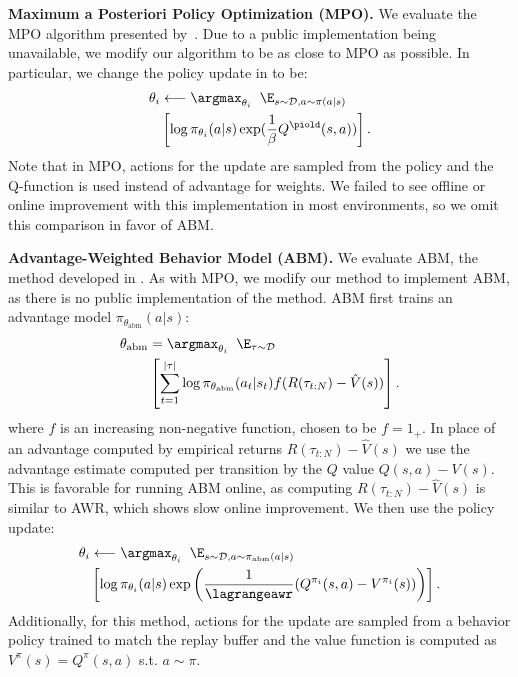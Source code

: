 \textbf{Maximum a Posteriori Policy Optimization (MPO).} We evaluate the MPO algorithm presented by~\citet{we2018mpo}. Due to a public implementation being unavailable, we modify our algorithm to be as close to MPO as possible. In particular, we change the policy update in \METHOD to be: 
\begin{align}
    \theta_i & \longleftarrow \argmax_{\theta_i} \; \; \E_{s \sim \mathcal{D}, a \sim \pi(a|s)} \; \nonumber \\ 
    &\left[\log \pi_{\theta_i}(a|s) \exp(\frac{1}{\beta}Q^\piold(s, a))\right].
\end{align}
Note that in MPO, actions for the update are sampled from the policy and the Q-function is used instead of advantage for weights. We failed to see offline or online improvement with this implementation in most environments, so we omit this comparison in favor of ABM.

\textbf{Advantage-Weighted Behavior Model (ABM).} We evaluate ABM, the method developed in \citet{siegel2020abm}. As with MPO, we modify our method to implement ABM, as there is no public implementation of the method. ABM first trains an advantage model $\pi_{\theta_\text{abm}}(a|s)$:
\begin{align}
    \theta_\text{abm} &= \argmax_{\theta_i} \; \; \E_{\tau \sim \mathcal{D}} \nonumber \\ &\left[\sum_{t=1}^{|\tau|} \log \pi_{\theta_\text{abm}}(a_t|s_t)f(R(\tau_{t:N})-\hat{V}(s))\right].
\end{align}
where $f$ is an increasing non-negative function, chosen to be $f = 1_+$. In place of an advantage computed by empirical returns $R(\tau_{t:N})-\hat{V}(s)$ we use the advantage estimate computed per transition by the $Q$ value $Q(s, a)-V(s)$. This is favorable for running ABM online, as computing $R(\tau_{t:N})-\hat{V}(s)$ is similar to AWR, which shows slow online improvement. We then use the policy update: 
\begin{align}
    \theta_i & \longleftarrow \argmax_{\theta_i} \; \; \E_{s \sim \mathcal{D}, a \sim \pi_\text{abm}(a|s)} \nonumber \\
    &\left[\log \pi_{\theta_i}(a|s)  \exp\left(\frac{1}{\lagrangeawr}(Q^{\pi_i}(s, a)-V^{\pi_i}(s))\right)\right].
\end{align}
Additionally, for this method, actions for the update are sampled from a behavior policy trained to match the replay buffer and the value function is computed as $V^\pi(s) = Q^\pi(s, a)$ s.t. $a \sim \pi$.

